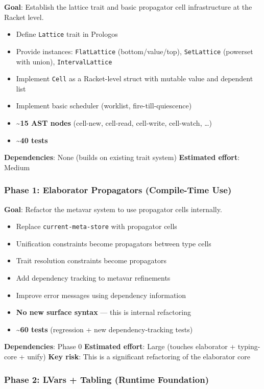 \documentclass[11pt]{article}
\begin{document}
\textbf{Goal}: Establish the lattice trait and basic propagator cell infrastructure
at the Racket level.

\begin{itemize}
\item Define \texttt{Lattice} trait in Prologos
\item Provide instances: \texttt{FlatLattice} (bottom/value/top), \texttt{SetLattice}
(powerset with union), \texttt{IntervalLattice}
\item Implement \texttt{Cell} as a Racket-level struct with mutable value and
dependent list
\item Implement basic scheduler (worklist, fire-till-quiescence)
\item \textbf{\textasciitilde{}15 AST nodes} (cell-new, cell-read, cell-write, cell-watch, \ldots{})
\item \textbf{\textasciitilde{}40 tests}
\end{itemize}

\textbf{Dependencies}: None (builds on existing trait system)
\textbf{Estimated effort}: Medium
\subsubsection{Phase 1: Elaborator Propagators (Compile-Time Use)}
\label{sec:orgf29a4dd}

\textbf{Goal}: Refactor the metavar system to use propagator cells internally.

\begin{itemize}
\item Replace \texttt{current-meta-store} with propagator cells
\item Unification constraints become propagators between type cells
\item Trait resolution constraints become propagators
\item Add dependency tracking to metavar refinements
\item Improve error messages using dependency information
\item \textbf{No new surface syntax} --- this is internal refactoring
\item \textbf{\textasciitilde{}60 tests} (regression + new dependency-tracking tests)
\end{itemize}

\textbf{Dependencies}: Phase 0
\textbf{Estimated effort}: Large (touches elaborator + typing-core + unify)
\textbf{Key risk}: This is a significant refactoring of the elaborator core
\subsubsection{Phase 2: LVars + Tabling (Runtime Foundation)}
\label{sec:org7fc556d}
\end{document}
